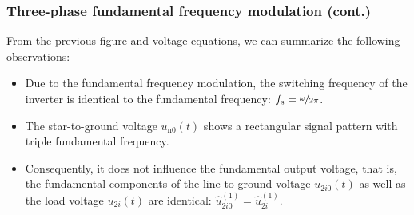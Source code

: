 \begin{frame}
	\frametitle{Three-phase fundamental frequency modulation (cont.)}
	From the previous figure and voltage equations, we can summarize the following observations:
	\begin{itemize}
		\item<1-> Due to the fundamental frequency modulation, the switching frequency of the inverter is identical to the fundamental frequency: $f_{\mathrm{s}} = \nicefrac{\omega}{2\pi}$.
		\item<2-> The star-to-ground voltage $u_{\mathrm{n0}}(t)$ shows a rectangular signal pattern with triple fundamental frequency.
		\item<3-> Consequently, it does not influence the fundamental output voltage, that is, the fundamental components of the line-to-ground voltage $u_{2i0}(t)$ as well as the load voltage $u_{2i}(t)$ are identical: $\hat{u}^{(1)}_{2i0}=\hat{u}^{(1)}_{2i}$.
	\end{itemize}\vspace{-0.25cm}
\end{frame}

